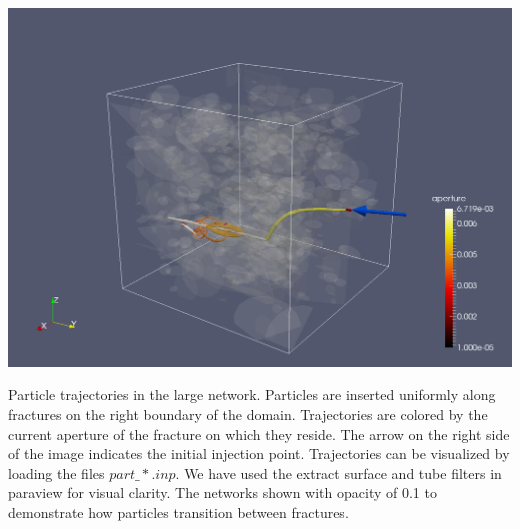\documentclass{article}
\begin{document}
\begin{center}
\includegraphics[width=0.75\linewidth]{figs/test_1000_fracture_trajectories.png}\\
\end{center}
Particle trajectories in the large network.    
Particles are inserted uniformly along fractures on the right boundary of the domain.  
Trajectories are colored by the current aperture of the fracture on which they reside. 
The arrow on the right side of the image indicates the initial injection point. 
Trajectories can be visualized by loading the files $part\_*.inp$. 
 We have used the extract surface and tube filters in paraview for visual clarity. 
The networks shown with opacity of 0.1 to demonstrate how particles transition between fractures.
\end{document}
